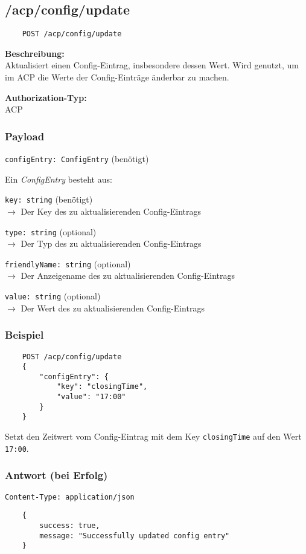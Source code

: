 \subsection{/acp/config/update}

\begin{lstlisting}
    POST /acp/config/update
\end{lstlisting}

\textbf{Beschreibung:} \\
Aktualisiert einen Config-Eintrag, insbesondere dessen Wert. Wird genutzt, um im ACP die Werte der Config-Einträge änderbar zu machen.

\textbf{Authorization-Typ:} \\
ACP

\subsubsection{Payload}

\lstinline{configEntry: ConfigEntry} (benötigt)

Ein \textit{ConfigEntry} besteht aus:

\lstinline{key: string} (benötigt) \\
$\rightarrow$ Der Key des zu aktualisierenden Config-Eintrags

\lstinline{type: string} (optional) \\
$\rightarrow$ Der Typ des zu aktualisierenden Config-Eintrags

\lstinline{friendlyName: string} (optional) \\
$\rightarrow$ Der Anzeigename des zu aktualisierenden Config-Eintrags

\lstinline{value: string} (optional) \\
$\rightarrow$ Der Wert des zu aktualisierenden Config-Eintrags


\subsubsection{Beispiel}

\begin{lstlisting}
    POST /acp/config/update
    {
        "configEntry": {
            "key": "closingTime",
            "value": "17:00"
        }
    }
\end{lstlisting}

Setzt den Zeitwert vom Config-Eintrag mit dem Key \lstinline{closingTime} auf den Wert \lstinline{17:00}.

\subsubsection{Antwort (bei Erfolg)}

\lstinline{Content-Type: application/json}
\begin{lstlisting}
    {
        success: true, 
        message: "Successfully updated config entry"
    }
\end{lstlisting}